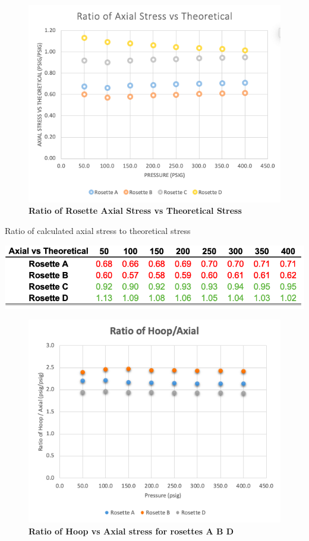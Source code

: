 \documentclass{article}
\begin{document}
\begin{figure} [H]
	\centering
	\includegraphics [width=1.0\textwidth]{plot_axialvstheor}
	\caption{ \textbf{Ratio of Rosette Axial Stress vs Theoretical Stress}}
\end{figure} 

\begin{table}[H]
  \caption{Ratio of calculated axial stress to theoretical stress}
  \includegraphics[width=\linewidth]{table_axial_theory}
  \centering
\end{table}

\begin{figure} [H]
	\centering
	\includegraphics [width=1.0\textwidth]{plot_hoop_vs_axial}
	\caption{ \textbf{Ratio of Hoop vs Axial stress for rosettes A B D }}
\end{figure} 
\end{document}
